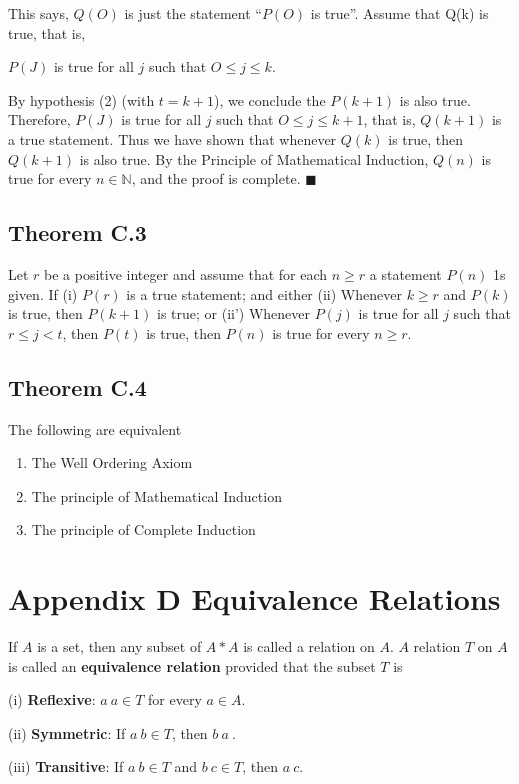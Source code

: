 \documentclass{article}
\begin{document}
This says, $Q(O)$ is just the statement ``$P(O)$ is true''. Assume that Q(k) is
true, that is, 
\begin{center}
    $P(J)$ is true for all $j$ such that $O \leq j \leq k$.
\end{center}

By hypothesis (2) (with $t = k + 1$), we conclude the $P(k + 1)$ is also true.
Therefore, $P(J)$ is true for all $j$ such that $O \leq j \leq k + 1$, that is, $Q(k + 1)$
is a true statement. Thus we have shown that whenever $Q(k)$ is true, then
$Q(k + 1)$ is also true. By the Principle of Mathematical Induction, $Q(n)$
is true for every $n \in \mathbb{N}$, and the proof is complete. $\blacksquare$  

\subsection*{Theorem C.3}

Let $r$ be a positive integer and assume that for each $n \geq r$ a statement $P(n)$
1s given. If
(i) $P(r)$ is a true statement;
and either
(ii) Whenever $k \geq r$ and $P(k)$ is true, then $P(k + 1)$ is true;
or
(ii') Whenever $P(j)$ is true for all $j$ such that $r \leq j < t$, then $P(t)$ is true,
then $P(n)$ is true for every $n \geq r$. 

\subsection*{Theorem C.4}
The following are equivalent
\begin{enumerate}
    \item The Well Ordering Axiom
    \item The principle of Mathematical Induction
    \item The principle of Complete Induction
\end{enumerate}

\section*{Appendix D Equivalence Relations}

If $A$ is a set, then any subset of $A * A$ is called a relation on $A$. $A$ relation $T$ on $A$
is called an \textbf{equivalence relation} provided that the subset $T$ is

(i) \textbf{Reflexive}: $a ~ a \in T$ for every $a \in A$.

(ii) \textbf{Symmetric}: If $a ~ b \in T$, then $b ~ a~$.

(iii) \textbf{Transitive}: If $a ~ b \in T$ and $b ~ c  \in T$, then $a ~ c$. 
\end{document}
